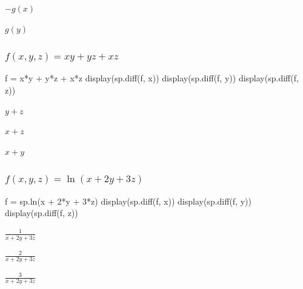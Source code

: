 \documentclass[
  letterpaper,
  DIV=11,
  numbers=noendperiod]{scrartcl}
\newenvironment{Shaded}{\begin{snugshade}}{\end{snugshade}}
\newcommand{\DecValTok}[1]{\textcolor[rgb]{0.68,0.00,0.00}{#1}}
\newcommand{\NormalTok}[1]{\textcolor[rgb]{0.00,0.23,0.31}{#1}}
\newcommand{\OperatorTok}[1]{\textcolor[rgb]{0.37,0.37,0.37}{#1}}
\begin{document}
$\displaystyle - g{\left(x \right)}$

$\displaystyle g{\left(y \right)}$

\hypertarget{fx-y-z-xyyzxz}{%
\subsubsection{\texorpdfstring{\(f(x, y, z) = xy+yz+xz\)}{f(x, y, z) = xy+yz+xz}}\label{fx-y-z-xyyzxz}}

\begin{Shaded}
\begin{Highlighting}[numbers=left,,]
\NormalTok{f }\OperatorTok{=}\NormalTok{ x}\OperatorTok{*}\NormalTok{y }\OperatorTok{+}\NormalTok{ y}\OperatorTok{*}\NormalTok{z }\OperatorTok{+}\NormalTok{ x}\OperatorTok{*}\NormalTok{z}
\NormalTok{display(sp.diff(f, x))}
\NormalTok{display(sp.diff(f, y))}
\NormalTok{display(sp.diff(f, z))}
\end{Highlighting}
\end{Shaded}

$\displaystyle y + z$

$\displaystyle x + z$

$\displaystyle x + y$

\hypertarget{fx-y-z-lnx-2y-3z}{%
\subsubsection{\texorpdfstring{\(f(x, y, z) = \ln(x + 2y + 3z)\)}{f(x, y, z) = \textbackslash ln(x + 2y + 3z)}}\label{fx-y-z-lnx-2y-3z}}

\begin{Shaded}
\begin{Highlighting}[numbers=left,,]
\NormalTok{f }\OperatorTok{=}\NormalTok{ sp.ln(x }\OperatorTok{+} \DecValTok{2}\OperatorTok{*}\NormalTok{y }\OperatorTok{+} \DecValTok{3}\OperatorTok{*}\NormalTok{z)}
\NormalTok{display(sp.diff(f, x))}
\NormalTok{display(sp.diff(f, y))}
\NormalTok{display(sp.diff(f, z))}
\end{Highlighting}
\end{Shaded}

$\displaystyle \frac{1}{x + 2 y + 3 z}$

$\displaystyle \frac{2}{x + 2 y + 3 z}$

$\displaystyle \frac{3}{x + 2 y + 3 z}$
\end{document}
